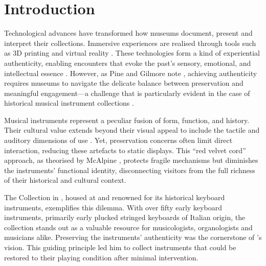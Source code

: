 \section{Introduction}\label{introduction}

Technological advances have transformed how museums document, present and
interpret their collections. Immersive experiences are realised through tools
such as 3D printing and virtual reality
\cite{allard2005use,Wachowiak01082009,RCM_2024_3D,Kuzminsky_LaserScan_2012,Schaich_3D_2007}.
These technologies form a kind of experiential authenticity, enabling encounters
that evoke the past's sensory, emotional, and intellectual essence
\cite{trant_Auth_1999}. However, as Pine and Gilmore note
\cite{pinegilmore_2007}, achieving authenticity requires museums to navigate the
delicate balance between preservation and meaningful engagement—a challenge that
is particularly evident in the case of historical musical instrument collections
\cite{McAlpine2014}.

Musical instruments represent a peculiar fusion of form, function, and history.
Their cultural value extends beyond their visual appeal to include the tactile
and auditory dimensions of use \cite{Fritz2017}. Yet, preservation concerns
often limit direct interaction, reducing these artefacts to static displays.
This ``red velvet cord'' approach, as theorised by McAlpine \cite{McAlpine2014},
protects fragile mechanisms but diminishes the instruments’ functional identity,
disconnecting visitors from the full richness of their historical and cultural
context.

The  Collection in , housed
at  and renowned for its historical
keyboard instruments, exemplifies this dilemma. With over fifty early keyboard
instruments, primarily early plucked stringed keyboards of Italian origin, the
collection stands out as a valuable resource for musicologists, organologists
and musicians alike. Preserving the instruments' authenticity was the
cornerstone of ’s vision. This guiding principle led
him to collect instruments that could be restored to their playing condition
after minimal intervention.


